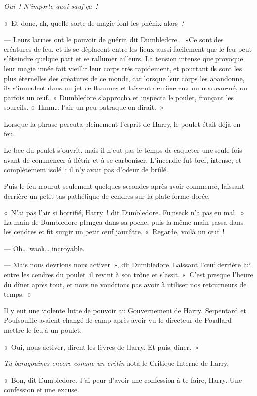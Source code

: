 \emph{Oui~!
N'importe quoi sauf ça~!}

«~Et donc, ah, quelle sorte de magie font les phénix alors~?

--- Leurs larmes ont le pouvoir de guérir, dit Dumbledore.
~»Ce sont des créatures de feu, et ils se déplacent entre les lieux aussi facilement que le feu peut s'éteindre quelque part et se rallumer ailleurs.
La tension intense que provoque leur magie innée fait vieillir leur corps très rapidement, et pourtant ils sont les plus éternelles des créatures de ce monde, car lorsque leur corps les abandonne, ils s'immolent dans un jet de flammes et laissent derrière eux un nouveau-né, ou parfois un œuf.~»
Dumbledore s'approcha et inspecta le poulet, fronçant les sourcils.
«~Hmm… l'air un peu patraque on dirait.~»

Lorsque la phrase percuta pleinement l'esprit de Harry, le poulet était déjà en feu.

Le bec du poulet s'ouvrit, mais il n'eut pas le temps de caqueter une seule fois avant de commencer à flétrir et à se carboniser.
L'incendie fut bref, intense, et complètement isolé~; il n'y avait pas d'odeur de brûlé.

Puis le feu mourut seulement quelques secondes après avoir commencé, laissant derrière un petit tas pathétique de cendres sur la plate-forme dorée.

«~N'ai pas l'air si horrifié, Harry~! dit Dumbledore.
Fumseck n'a pas eu mal.~»
La main de Dumbledore plongea dans sa poche, puis la même main passa dans les cendres et fit surgir un petit œuf jaunâtre.
«~Regarde, voilà un œuf~!

--- Oh… waoh… incroyable…

--- Mais nous devrions nous activer~», dit Dumbledore.
Laissant l'œuf derrière lui entre les cendres du poulet, il revint à son trône et s'assit.
«~C'est presque l'heure du dîner après tout, et nous ne voudrions pas avoir à utiliser nos retourneurs de temps.~»

Il y eut une violente lutte de pouvoir au Gouvernement de Harry.
Serpentard et Poufsouffle avaient changé de camp après avoir vu le directeur de Poudlard mettre le feu à un poulet.

«~Oui, nous activer, dirent les lèvres de Harry.
Et puis, dîner.~»

\emph{Tu baragouines encore comme un crétin} nota le Critique Interne de Harry.

«~Bon, dit Dumbledore.
J'ai peur d'avoir une confession à te faire, Harry.
Une confession et une excuse.

